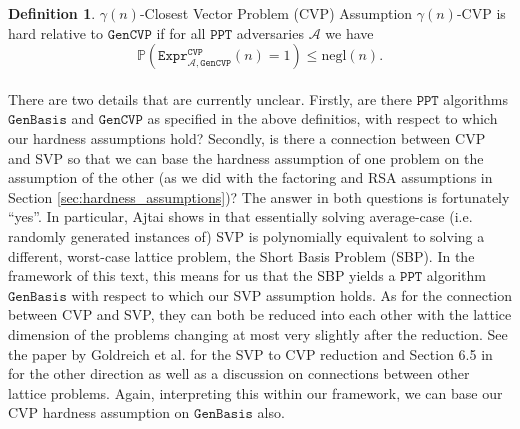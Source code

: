 \documentclass{article}
\theoremstyle{definition}
\newtheorem{definition}{Definition}[section]
\theoremstyle{example}
\newcommand{\A}{\mathcal{A}}
\newcommand{\Prob}{\mathbb{P}}
\newcommand{\PPT}{\texttt{PPT}}
\newcommand{\negl}{\text{negl}}
\newcommand{\Expr}[2]{\texttt{Expr}^{\texttt{#1}}_{#2}}
\newcommand{\GenBasis}{\texttt{GenBasis}}
\newcommand{\GenCVP}{\texttt{GenCVP}}
\begin{document}
\begin{definition}{$\gamma(n)$-Closest Vector Problem (CVP) Assumption}
   $\gamma(n)$-CVP is hard relative to $\GenCVP$ if for all $\PPT$ adversaries $\A$ we
  have
  \[
    \Prob(\Expr{CVP}{\A, \GenCVP}(n) = 1) \leq \negl(n).
  \]
\end{definition}
\paragraph{} There are two details that are currently unclear. Firstly, are
there $\PPT$ algorithms $\GenBasis$ and $\GenCVP$ as specified in the above
definitios, with respect to which our hardness assumptions hold? Secondly, is
there a connection between CVP and SVP so that we can base the hardness
assumption of one problem on the assumption of the other (as we did with the
factoring and RSA assumptions in Section \ref{sec:hardness_assumptions})? The answer in both
questions is fortunately ``yes''. In particular, Ajtai shows in
\cite{AjtaiLatticeAvgWorst} that essentially solving average-case (i.e. randomly
generated instances of) SVP is polynomially equivalent to solving a different,
worst-case lattice problem, the Short Basis Problem (SBP). In the framework of
this text, this means for us that the SBP yields a $\PPT$ algorithm $\GenBasis$
with respect to which our SVP assumption holds. As for the connection between
CVP and SVP, they can both be reduced into each other with the lattice dimension
of the problems changing at most very slightly after the reduction. See the
paper by Goldreich et al. for the SVP to CVP reduction \cite{GOLDREICH199955}
and Section 6.5 in \cite{hoffstein2014introduction} for the other direction as
well as a discussion on connections between other lattice problems. Again,
interpreting this within our framework, we can base our CVP hardness assumption
on $\GenBasis$ also.
\end{document}
